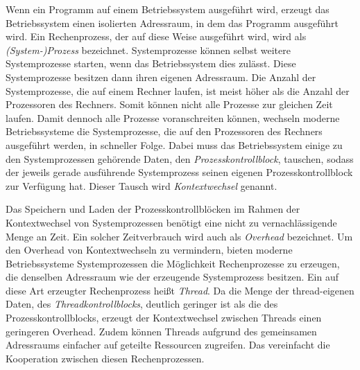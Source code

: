 \documentclass[12pt,a4paper,listof=totocnumbered,parskip=half]{scrreprt}
\begin{document}
Wenn ein Programm auf einem Betriebssystem ausgeführt wird, erzeugt das Betriebssystem einen isolierten Adressraum, in dem das Programm ausgeführt wird. Ein Rechenprozess, der auf diese Weise ausgeführt wird, wird als \emph{(System-)Prozess} bezeichnet. Systemprozesse können selbst weitere Systemprozesse starten, wenn das Betriebssystem dies zulässt. Diese Systemprozesse besitzen dann ihren eigenen Adressraum. Die Anzahl der Systemprozesse, die auf einem Rechner laufen, ist meist höher als die Anzahl der Prozessoren des Rechners. Somit können nicht alle Prozesse zur gleichen Zeit laufen. Damit dennoch alle Prozesse voranschreiten können, wechseln moderne Betriebssysteme die Systemprozesse, die auf den Prozessoren des Rechners ausgeführt werden, in schneller Folge. Dabei muss das Betriebssystem einige zu den Systemprozessen gehörende Daten, den \emph{Prozesskontrollblock}, tauschen, sodass der jeweils gerade ausführende Systemprozess seinen eigenen Prozesskontrollblock zur Verfügung hat. Dieser Tausch wird \emph{Kontextwechsel} genannt.\cite{Jobst2018}

Das Speichern und Laden der Prozesskontrollblöcken im Rahmen der Kontextwechsel von Systemprozessen benötigt eine nicht zu vernachlässigende Menge an Zeit. Ein solcher Zeitverbrauch wird auch als \emph{Overhead} bezeichnet. Um den Overhead von Kontextwechseln zu vermindern, bieten moderne Betriebssysteme Systemprozessen die Möglichkeit Rechenprozesse zu erzeugen, die denselben Adressraum wie der erzeugende Systemprozess besitzen. Ein auf diese Art erzeugter Rechenprozess heißt \emph{Thread}. Da die Menge der thread-eigenen Daten, des \emph{Threadkontrollblocks}, deutlich geringer ist als die des Prozesskontrollblocks, erzeugt der Kontextwechsel zwischen Threads einen geringeren Overhead. Zudem können Threads aufgrund des gemeinsamen Adressraums einfacher auf geteilte Ressourcen zugreifen. Das vereinfacht die Kooperation zwischen diesen Rechenprozessen.\cite{Jobst2018}
\end{document}
